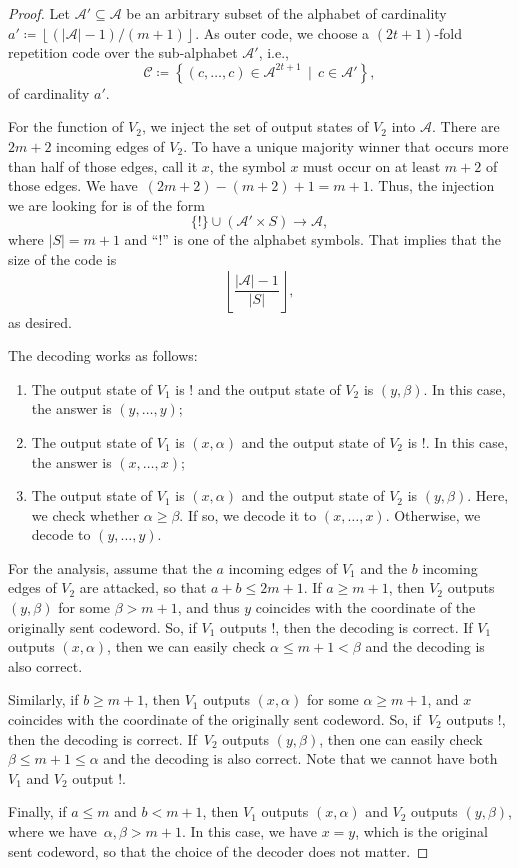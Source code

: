 \documentclass[10pt,a4paper]{amsart}
\newcommand{\mA}{\mathcal{A}}
\newcommand{\mC}{\mathcal{C}}
\begin{document}
\begin{proof}
Let $\mathcal{A}'\subseteq\mathcal{A}$ be an arbitrary subset of the alphabet of cardinality $a'\coloneqq\left\lfloor(|\mathcal{A}|-1)/(m+1)\right\rfloor$.
As outer code, we choose a $(2t+1)$-fold repetition code over the sub-alphabet $\mathcal{A}'$, i.e., $$\mC\coloneqq\left\{(c,\dots,c)\in\mathcal{A}^{2t+1}\,\mid\,c\in\mathcal{A}'\right\},$$ of cardinality $a'$.


For the function of $V_2$, we inject
the set of output states of $V_2$ into $\mathcal{A}$. There are $2m+2$ incoming edges of $V_2$. To have a unique majority winner that occurs more than half of those edges, call it $x$, the symbol $x$ must occur on at least $m+2$ of those edges. We have~$(2m+2)-(m+2)+1=m+1$. Thus, the injection we are looking for is of the form
$$\{!\} \cup (\mA'\times S) \to \mA,$$
where $|S|=m+1$ and ``!'' is one of the alphabet symbols. That implies that the size of the code is $$\left\lfloor\frac{\lvert \mathcal{A} \rvert-1}{\lvert S \rvert}\right\rfloor,$$ as desired. 

The decoding works as follows:
\begin{enumerate}
    \item The output state of $V_1$ is $!$ and the output state of $V_2$ is $(y,\beta)$. In this case, the answer is $(y,\ldots,y)$;
    \item The output state of $V_1$ is $(x,\alpha)$ and the output state of $V_2$ is $!$. In this case, the answer is $(x,\ldots,x)$;
    \item The output state of $V_1$ is $(x,\alpha)$ and the output state of $V_2$ is $(y,\beta)$. Here, we check whether $\alpha \ge \beta$. If so, we decode it to $(x,\ldots,x)$. Otherwise, we decode to $(y,\ldots,y)$.
\end{enumerate} 
For the analysis, assume that the $a$ incoming edges of $V_1$ and the $b$ incoming edges of $V_2$ are attacked, so that $a+b\le 2m+1$.
If $a\ge m+1$, then $V_2$ outputs $(y,\beta)$ for some $\beta > m+1$, and thus $y$ coincides with the coordinate of the originally sent codeword. So, if $V_1$ outputs $!$, then the decoding is correct. If $V_1$ outputs $(x,\alpha)$, then we can easily check $\alpha\le m+1 <\beta$ and the decoding is also correct.

Similarly, if $b\ge m+1$, then $V_1$ outputs $(x,\alpha)$ for some $\alpha \ge m+1$, and $x$ coincides with the coordinate of the originally sent codeword. So, if~$V_2$ outputs $!$, then the decoding is correct. If~$V_2$ outputs $(y,\beta)$, then one can easily check $\beta\le m+1 \le \alpha$ and the decoding is also correct. Note that we cannot have  
both $V_1$ and $V_2$ output $!$.

Finally, if $a \le m$ and $b<m+1$, then $V_1$ outputs $(x,\alpha)$ and $V_2$ outputs $(y,\beta)$, where we have~$\alpha,\beta>m+1$. In this case, we have $x=y$, which is the original sent codeword, so that the choice of the decoder does not matter.
\end{proof}
\end{document}
